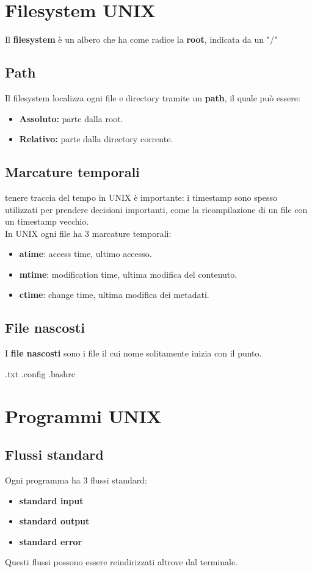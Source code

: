 \documentclass[12pt,a4paper]{article}
\let\oldsection\section
\renewcommand{\section}{\clearpage\oldsection}
\begin{document}
\section{Filesystem UNIX}
Il \textbf{filesystem} è un albero che ha come radice la \textbf{root}, indicata da un "/"
\subsection{Path}
Il filesystem localizza ogni file e directory tramite un \textbf{path}, il quale può essere:
\begin{itemize}
    \item \textbf{Assoluto:} parte dalla root.
    \item \textbf{Relativo:} parte dalla directory corrente.
\end{itemize}
\subsection{Marcature temporali}
tenere traccia del tempo in UNIX è importante: i timestamp sono spesso utilizzati per prendere decisioni importanti, come la ricompilazione di un file con un timestamp vecchio.\\
In UNIX ogni file ha 3 marcature temporali:
\begin{itemize}
    \item \textbf{atime}: access time, ultimo accesso.
    \item \textbf{mtime}: modification time, ultima modifica del contenuto.
    \item \textbf{ctime}: change time, ultima modifica dei metadati.
\end{itemize}
\subsection{File nascosti}
I \textbf{file nascosti} sono i file il cui nome solitamente inizia con il punto.
\begin{center}
    .txt
    .config
    .bashrc
\end{center}

\section{Programmi UNIX}
\subsection{Flussi standard}
Ogni programma ha 3 flussi standard:
\begin{itemize}
    \item \textbf{standard input}
    \item \textbf{standard output}
    \item \textbf{standard error}
\end{itemize}
Questi flussi possono essere reindirizzati altrove dal terminale.
\end{document}

